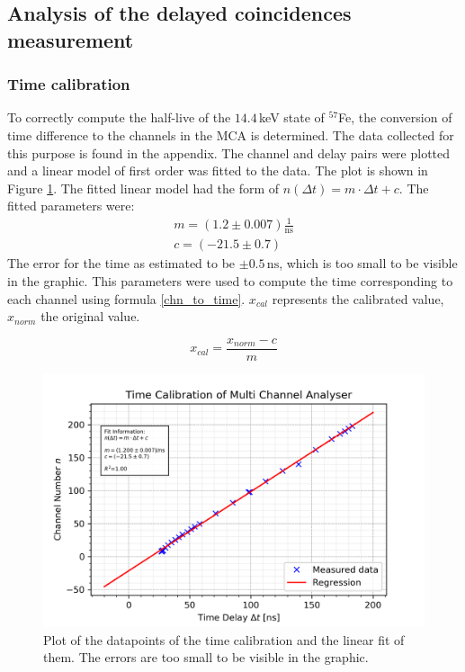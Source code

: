 \documentclass[30pt,a4paper]{article}
\begin{document}
 	\subsection{Analysis of the delayed coincidences measurement}
 	\subsubsection{Time calibration}
 	To correctly compute the half-live of the $14.4$\,keV state of $^{57}$Fe, the conversion of time difference to the channels in the MCA is determined.
 	The data collected for this purpose is found in the appendix. 
 	The channel and delay pairs were plotted and a linear model of first order was
 	fitted to the data. The plot is shown in Figure \ref{time_cal_plot}.
 	The fitted linear model had the form of $n(\Delta t) = m \cdot \Delta t + c$.
 	The fitted parameters were:
	\begin{eqnarray}
 	m = (1.2 \pm 0.007)\frac{1}{\textrm{ns}} \\
 	c = (-21.5 \pm 0.7)
 	\end{eqnarray}
 	The error for the time as estimated to be $\pm 0.5\,\textrm{ns}$, which is too small
 	to be visible in the graphic.
 	This parameters were used to compute the time corresponding to each channel using 
 	formula \ref{chn_to_time}. $x_{cal}$ represents the calibrated value, $x_{norm}$ the
 	original value.
 	
 	\begin{equation}
 	x_{cal} = \frac{x_{norm}-c}{m}
 	\label{chn_to_time}
 	\end{equation}
 	
 	\begin{figure}[h]
 		\includegraphics{Bilder/time_cal}
 		\centering
 		\caption{\small Plot of the datapoints of the time calibration and the linear fit of them. The errors are too small to be visible in the graphic.}
 		\label{time_cal_plot}
 	\end{figure}
 	
 	
 	
 	
 	
 	
\end{document}
